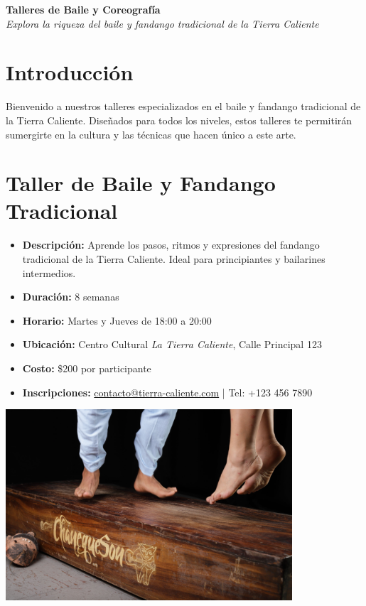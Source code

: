 \documentclass[a4paper,12pt]{article}
\begin{document}
\begin{center}
    \huge \textbf{Talleres de Baile y Coreografía} \\
    \vspace{0.5cm}
    \large \textit{Explora la riqueza del baile y fandango tradicional de la Tierra Caliente}
\end{center}

\vspace{1cm}

\section*{Introducción}
Bienvenido a nuestros talleres especializados en el baile y fandango tradicional de la Tierra Caliente. Diseñados para todos los niveles, estos talleres te permitirán sumergirte en la cultura y las técnicas que hacen único a este arte.

\section{Taller de Baile y Fandango Tradicional}
\begin{itemize}
    \item \textbf{Descripción:} Aprende los pasos, ritmos y expresiones del fandango tradicional de la Tierra Caliente. Ideal para principiantes y bailarines intermedios.
    \item \textbf{Duración:} 8 semanas
    \item \textbf{Horario:} Martes y Jueves de 18:00 a 20:00
    \item \textbf{Ubicación:} Centro Cultural \emph{La Tierra Caliente}, Calle Principal 123
    \item \textbf{Costo:} \$200 por participante
    \item \textbf{Inscripciones:} \href{mailto:contacto@tierra-caliente.com}{contacto@tierra-caliente.com} | Tel: +123 456 7890
\end{itemize}

\begin{center}
    \includegraphics[width=0.8\textwidth]{IMG_4296.jpg} %
\end{center}
\end{document}
